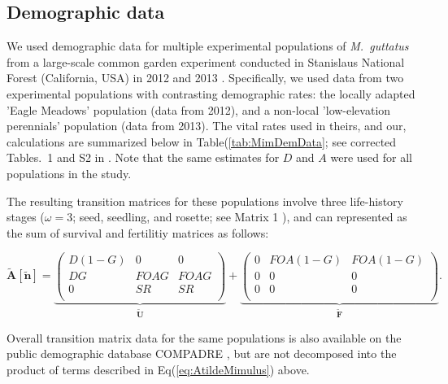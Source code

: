 \documentclass[11pt,draft]{article}
\def\mbf#1{\mathbf{#1}}
\begin{document}
\subsection*{Demographic data}

We used demographic data for multiple experimental populations of {\itshape M.~guttatus} from a large-scale common garden experiment conducted in Stanislaus National Forest (California, USA) in 2012 and 2013 \citep{PetersonEtAl2016}. Specifically, we used data from two experimental populations with contrasting demographic rates: the locally adapted 'Eagle Meadows' population (data from 2012), and a non-local 'low-elevation perennials' population (data from 2013). The vital rates used in theirs, and our, calculations are summarized below in Table(\ref{tab:MimDemData}; see corrected Tables.~1 and S2 in \citet{PetersonEtAl2016, PetersonEtAl2017}. Note that the same estimates for $D$ and $A$ were used for all populations in the study. 

The resulting transition matrices for these populations involve three life-history stages ($\omega = 3$; seed, seedling, and rosette; see Matrix 1 \citealt{PetersonEtAl2016}), and can represented as the sum of survival and fertilitiy matrices as follows:

\begin{linenomath*}
\begin{equation} \label{eq:AtildeMimulus}
	\mathbf{\tilde{A}}[\tilde{\mbf{n}}] = 
			\underbrace{\left(
			\begin{array}{ccc}
				D(1 - G) & 0 & 0 \\
				DG & FOAG & FOAG \\
				0 & SR & SR \\
			\end{array} \right)}_{\tilde{\mbf{U}}} +
			\underbrace{\left(
			\begin{array}{ccc}
				0 & FOA(1 - G) & FOA(1 - G) \\
				0 & 0 & 0 \\
				0 & 0 & 0 \\
			\end{array} \right)}_{\tilde{\mbf{F}}}.
\end{equation}
\end{linenomath*}

Overall transition matrix data for the same populations is also available on the public demographic database COMPADRE \citep{CompadreDB2020}, but are not decomposed into the product of terms described in Eq(\ref{eq:AtildeMimulus}) above.
\end{document}
